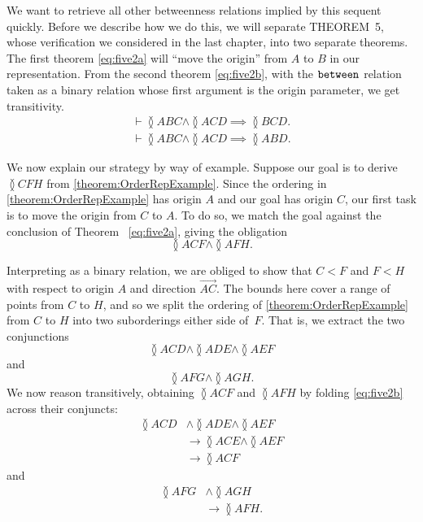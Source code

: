 We want to retrieve all other betweenness relations implied by this sequent quickly. Before we describe how we do this, we will separate THEOREM~5, whose verification we considered in the last chapter, into two separate theorems. The first theorem \eqref{eq:five2a} will ``move the origin'' from $A$ to $B$ in our representation. From the second theorem \eqref{eq:five2b}, with the $\texttt{between}$ relation taken as a binary relation whose first argument is the origin parameter, we get transitivity.
\begin{gather}
\label{eq:five2a}\vdash \between{A}{B}{C} \wedge \between{A}{C}{D} \implies \between{B}{C}{D}.\\
\label{eq:five2b}\vdash \between{A}{B}{C} \wedge \between{A}{C}{D} \implies \between{A}{B}{D}.
\end{gather}

We now explain our strategy by way of example. Suppose our goal is to derive $\between{C}{F}{H}$ from \eqref{theorem:OrderRepExample}. Since the ordering in \eqref{theorem:OrderRepExample} has origin $A$ and our goal has origin $C$, our first task is to move the origin from $C$ to $A$. To do so, we match the goal against the conclusion of Theorem~ \ref{eq:five2a}, giving the obligation
\begin{displaymath}
\between{A}{C}{F} \wedge \between{A}{F}{H}.
\end{displaymath}

Interpreting  as a binary relation, we are obliged to show that $C < F$ and $F < H$ with respect to origin $A$ and direction $\overrightarrow{AC}$. The bounds here cover a range of points from $C$ to $H$, and so we split the ordering of \eqref{theorem:OrderRepExample} from $C$ to $H$ into two suborderings either side of~$F$. That is, we extract the two conjunctions
\begin{displaymath}
\between{A}{C}{D} \wedge \between{A}{D}{E} \wedge\between{A}{E}{F}
\end{displaymath}
and
\begin{displaymath}
\between{A}{F}{G}\wedge\between{A}{G}{H}.
\end{displaymath}
We now reason transitively, obtaining $\between{A}{C}{F}$ and $\between{A}{F}{H}$ by folding \eqref{eq:five2b} across their conjuncts:
\begin{align*}
\between{A}{C}{D} &\wedge \between{A}{D}{E} \wedge\between{A}{E}{F}\\
&\longrightarrow \between{A}{C}{E} \wedge \between{A}{E}{F}\\
&\longrightarrow \between{A}{C}{F}
\end{align*}
and
\begin{align*}
\between{A}{F}{G} &\wedge \between{A}{G}{H}\\
&\longrightarrow \between{A}{F}{H}.
\end{align*}

